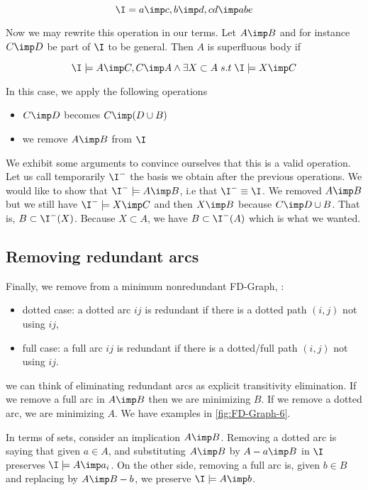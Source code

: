 \[ \I = {a \imp c, b \imp d, cd \imp abe} \] 

\noindent Now we may rewrite this operation in our terms. Let $A \imp B$ and 
for instance $C \imp D$ be part of $\I$ to be general. Then $A$ is superfluous
body if

\[ \I \models A \imp C, C \imp A \land \exists X \subset A \; s.t \;
\I \models X \imp C \]

\noindent In this case, we apply the following operations
\begin{itemize}
	\item $C \imp D$ becomes $C \imp (D \cup B)$
	\item we remove $A \imp B$ from $\I$
\end{itemize}

\noindent We exhibit some arguments to convince ourselves that this is a valid
operation. Let us call temporarily $\I^{-}$ the basis we obtain after the 
previous operations. We would like to show that $\I^{-} \models A \imp B$, i.e
that $\I^{-} \equiv \I$. We removed $A \imp B$ but we still have $\I^{-} \models
X \imp C$ and then $X \imp B$ because $C \imp D \cup B$. That is, $B \subset 
\I^{-}(X)$. Because $X \subset A$, we have $B \subset \I^{-}(A)$ which is what
we wanted. 


\subsection{Removing redundant arcs}

Finally, we remove from a minimum nonredundant FD-Graph, :
\begin{itemize}
	\item dotted case: a dotted arc $ij$ is redundant if there is a dotted 
	path $(i, j)$ not using $ij$,
	\item full case: a full arc $ij$ is redundant if there is a dotted/full 
	path $(i, j)$ not using $ij$.
\end{itemize}

\noindent we can think of eliminating redundant arcs as explicit transitivity
elimination. If we remove a full arc in $A \imp B$ then we are minimizing $B$.
If we remove a dotted arc, we are minimizing $A$. We have examples in 
\ref{fig:FD-Graph-6}. 



In terms of sets, consider an implication $A \imp B$. Removing a dotted arc is
saying that given $a \in A$, and substituting $A \imp B$ by $A - a \imp B$ in
$\I$ preserves $\I \models A \imp a_i$. On the other side, removing a full arc
is, given $b \in B$ and replacing by $A \imp B - b$, we preserve $\I \models 
A \imp b$.